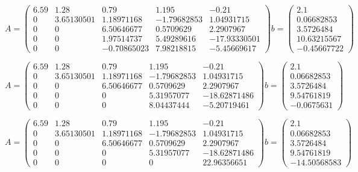 \documentclass{article}
\begin{document}
   $$ A =
\left(   \begin{matrix}
        6.59 & 1.28 & 0.79 & 1.195 & -0.21 \\
        0 & 3.65130501 & 1.18971168 & -1.79682853 & 1.04931715 \\
        0 & 0 & 6.50646677 & 0.5709629 & 2.2907967  \\
        0 & 0 & 1.97514737 & 5.49289616 & -17.93330501 \\
        0 & 0 & -0.70865023 & 7.98218815 & -5.45669617
   \end{matrix}\right)
   b =
\left(   \begin{matrix}
        2.1       \\
        0.06682853\\
        3.5726484 \\
        10.63215567\\
        -0.45667722
    \end{matrix}\right)
  $$

  $$ A =
 \left( \begin{matrix}
        6.59 & 1.28 & 0.79 & 1.195 & -0.21 \\
        0 & 3.65130501 & 1.18971168 & -1.79682853 & 1.04931715 \\
        0 & 0 & 6.50646677 & 0.5709629 & 2.2907967  \\
        0 & 0 & 0 & 5.31957077 & -18.62871486 \\
        0 & 0 & 0 & 8.04437444 & -5.20719461
  \end{matrix}\right)
  b =
\left(  \begin{matrix}
    2.1       \\
    0.06682853\\
    3.5726484 \\
    9.54761819\\
    -0.0675631
\end{matrix}\right)
 $$

 $$ A =
\left( \begin{matrix}
        6.59 & 1.28 & 0.79 & 1.195 & -0.21\\
        0 & 3.65130501 & 1.18971168 & -1.79682853 & 1.04931715\\
        0 & 0 & 6.50646677 & 0.5709629 & 2.2907967 \\
        0 & 0 & 0 & 5.31957077 & -18.62871486\\
        0 & 0 & 0 & 0 & 22.96356651
 \end{matrix}\right)
 b =
\left( \begin{matrix}
    2.1       \\
    0.06682853\\
    3.5726484 \\
    9.54761819\\
    -14.50568583
\end{matrix}\right)
$$
\end{document}
